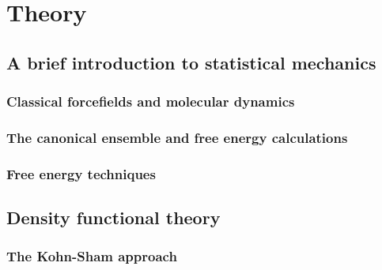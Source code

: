 \chapter{Theory}

\section{A brief introduction to statistical mechanics}

\subsection{Classical forcefields and molecular dynamics}

\subsection{The canonical ensemble and free energy calculations}

\subsection{Free energy techniques}



\section{Density functional theory}

\subsection{The Kohn-Sham approach}

